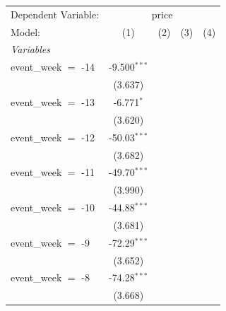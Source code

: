 
\begingroup
\centering
\begin{tabular}{lcccc}
   \tabularnewline \midrule \midrule
   Dependent Variable: & \multicolumn{4}{c}{price}\\
   Model:                                                  & (1)            & (2)           & (3)          & (4)\\  
   \midrule
   \emph{Variables}\\
   event\_week $=$ -14                                     & -9.500$^{***}$ &               &              &   \\   
                                                           & (3.637)        &               &              &   \\   
   event\_week $=$ -13                                     & -6.771$^{*}$   &               &              &   \\   
                                                           & (3.620)        &               &              &   \\   
   event\_week $=$ -12                                     & -50.03$^{***}$ &               &              &   \\   
                                                           & (3.682)        &               &              &   \\   
   event\_week $=$ -11                                     & -49.70$^{***}$ &               &              &   \\   
                                                           & (3.990)        &               &              &   \\   
   event\_week $=$ -10                                     & -44.88$^{***}$ &               &              &   \\   
                                                           & (3.681)        &               &              &   \\   
   event\_week $=$ -9                                      & -72.29$^{***}$ &               &              &   \\   
                                                           & (3.652)        &               &              &   \\   
   event\_week $=$ -8                                      & -74.28$^{***}$ &               &              &   \\   
                                                           & (3.668)        &               &              &   \\   

\end{tabular}
